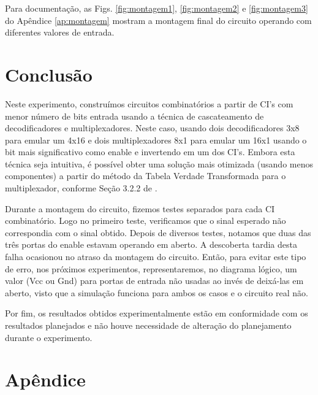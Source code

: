 \documentclass[a4,12pt]{horizon-theme}
\begin{document}
Para documentação, as Figs. \ref{fig:montagem1}, \ref{fig:montagem2} e \ref{fig:montagem3} do Apêndice \ref{ap:montagem} mostram a montagem final do circuito operando com diferentes valores de entrada.




\section{Conclusão}
Neste experimento, construímos circuitos combinatórios a partir de CI's com menor número de bits entrada usando a técnica de cascateamento de decodificadores e multiplexadores. Neste caso, usando dois decodificadores 3x8 para emular um 4x16 e dois multiplexadores 8x1 para emular um 16x1 usando o bit mais significativo como enable e invertendo em um dos CI's. Embora esta técnica seja intuitiva, é possível obter uma solução mais otimizada (usando menos componentes) a partir do método da Tabela Verdade Transformada para o multiplexador, conforme Seção 3.2.2 de \cite{saraiva}.

Durante a montagem do circuito, fizemos testes separados para cada CI combinatório. Logo no primeiro teste, verificamos que o sinal esperado não correspondia com o sinal obtido. Depois de diversos testes, notamos que duas das três portas do enable estavam operando em aberto. A descoberta tardia desta falha ocasionou no atraso da montagem do circuito. Então, para evitar este tipo de erro, nos próximos experimentos, representaremos, no diagrama lógico, um valor (Vcc ou Gnd) para portas de entrada não usadas ao invés de deixá-las em aberto, visto que a simulação funciona para ambos os casos e o circuito real não.

Por fim, os resultados obtidos experimentalmente estão em conformidade com os resultados planejados e não houve necessidade de alteração do planejamento durante o experimento.



\clearpage
\newpage
\appendix
\section*{Apêndice}
\renewcommand{\thesubsection}{\Alph{subsection}}
\end{document}
